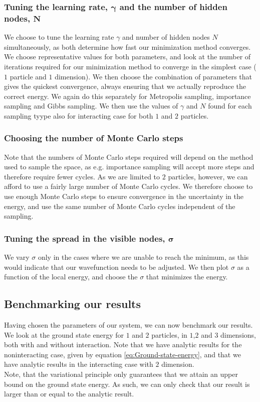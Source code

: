 \documentclass[a4paper, 10pt]{article}
\begin{document}
	\subsubsection{Tuning the learning rate, $\boldsymbol{\gamma}$ and the number of hidden nodes, $\boldsymbol{N}$}
	We choose to tune the learning rate $\gamma$ and number of hidden nodes $N$ simultaneously, as both determine how fast our minimization method converges. We choose representative values for both parameters, and look at the number of iterations required for our minimization method to converge in the simplest case ($1$ particle and $1$ dimension). We then choose the combination of parameters that gives the quickest convergence, always ensuring that we actually reproduce the correct energy. We again do this separately for Metropolis sampling, importance sampling and Gibbs sampling. We then use the values of $\gamma$ and $N$ found for each sampling tyype also for interacting case for both $1$ and $2$ particles.
	\subsubsection{Choosing the number of Monte Carlo steps}
	Note that the numbers of Monte Carlo steps required will depend on the method used to sample the space, as e.g. importance sampling will accept more steps and therefore require fewer cycles. As we are limited to $2$ particles, however, we can afford to use a fairly large number of Monte Carlo cycles. We therefore choose to use enough Monte Carlo steps to ensure convergence in the uncertainty in the energy, and use the same number of Monte Carlo cycles independent of the sampling. 
	\subsubsection{Tuning the spread in the visible nodes, $\boldsymbol{\sigma}$}
	We vary $\sigma$ only in the cases where we are unable to reach the minimum, as this would indicate that our wavefunction needs to be adjusted. We then plot $\sigma$ as a function of the local energy, and choose the $\sigma$ that minimizes the energy.
	\subsection{Benchmarking our results}
	Having chosen the parameters of our system, we can now benchmark our results. We look at the ground state energy for $1$ and $2$ particles, in $1$,$2$ and $3$ dimensions, both with and without interaction. Note that we have analytic results for the noninteracting case, given by equation \ref{eq:Ground-state-energy}, and that we have analytic results in the interacting case with $2$ dimension.\\
	\linebreak
	Note, that the variational principle only guarantees that we attain an upper bound on the ground state energy. As such, we can only check that our result is larger than or equal to the analytic result.
\end{document}
